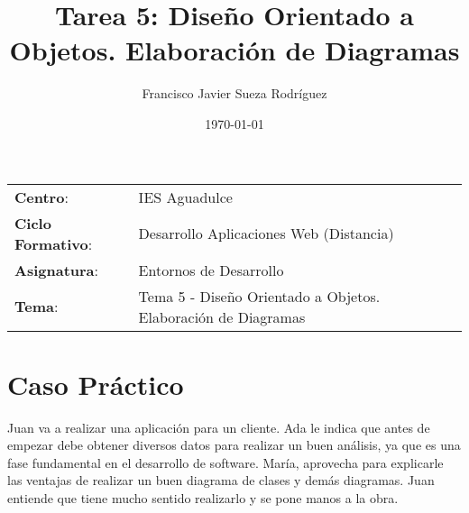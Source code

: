 


\title{
    \vspace{10ex}
    \normalfont \normalsize
    \huge \textbf{Tarea 5: Diseño Orientado a Objetos. Elaboración de Diagramas}
}
\author{Francisco Javier Sueza Rodríguez}
\date{\normalsize\today}



\maketitle

\thispagestyle{empty}

\vspace{75ex}

\begin{center}
    \begin{tabular}{l l}
        \textbf{Centro}: & IES Aguadulce \\
        \textbf{Ciclo Formativo}: & Desarrollo Aplicaciones Web (Distancia)\\
        \textbf{Asignatura}: & Entornos de Desarrollo\\
       \textbf{Tema}: & Tema 5 - Diseño Orientado a Objetos. Elaboración de Diagramas\\
    \end{tabular}
\end{center}

\newpage

\tableofcontents

\newpage

\listoffigures

\newpage

\section{Caso Práctico}
Juan va a realizar una aplicación para un cliente. Ada le indica que antes de empezar debe obtener diversos datos para realizar un buen análisis, ya que es una fase fundamental en el desarrollo de software. María, aprovecha para explicarle las ventajas de realizar un buen diagrama de clases y demás diagramas. Juan entiende que tiene mucho sentido realizarlo y se pone manos a la obra.


